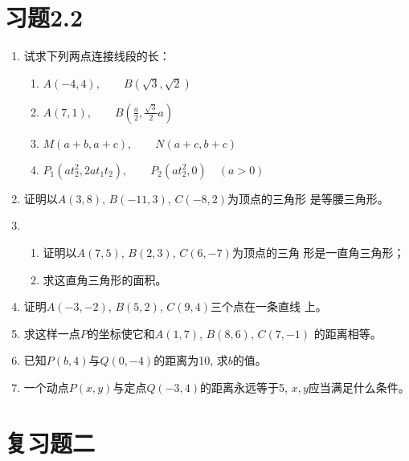 \section*{习题2.2}
\begin{enumerate}
    \item 试求下列两点连接线段的长：
\begin{enumerate}
    \item $A(-4,4),\qquad B(\sqrt{3},\sqrt{2})$
    \item $A(7,1),\qquad B\left(\frac{a}{2},\frac{\sqrt{3}}{2}a\right)$
    \item $M(a+b,a+c),\qquad N(a+c,b+c)$
    \item $P_1(at^2_2, 2at_1t_2),\qquad P_2(at^2_2,0)\quad (a>0)$
\end{enumerate}

\item 证明以$A(3,8)$, $B(-11,3)$, $C(-8,2)$为顶点的三角形
是等腰三角形。
\item \begin{enumerate}
    \item 证明以$A(7,5)$, $B(2,3)$, $C(6,-7)$为顶点的三角
形是一直角三角形；
\item 求这直角三角形的面积。
\end{enumerate}

\item  证明$A(-3,-2)$, $B(5,2)$, $C(9,4)$三个点在一条直线
上。
\item 求这样一点$P$的坐标使它和$A(1,7)$, $B(8,6)$, $C(7,-1)$
的距离相等。
\item 已知$P(b,4)$与$Q(0,-4)$的距离为10, 求$b$的值。
\item 一个动点$P(x,y)$与定点$Q(-3,4)$的距离永远等于5, $x,
y$应当满足什么条件。
\end{enumerate}


\section*{复习题二}


